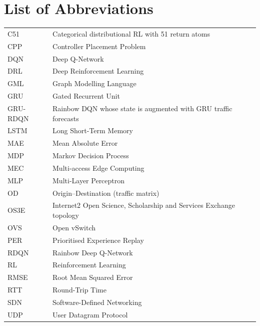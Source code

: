 \chapter*{List of Abbreviations}
\begin{tabular}{@{}p{}p{}@{}}
C51 & Categorical distributional RL with 51 return atoms \\
CPP & Controller Placement Problem \\
DQN & Deep Q-Network \\
DRL & Deep Reinforcement Learning \\
GML & Graph Modelling Language \\
GRU & Gated Recurrent Unit \\
GRU-RDQN & Rainbow DQN whose state is augmented with GRU traffic forecasts \\
LSTM & Long Short-Term Memory \\
MAE & Mean Absolute Error \\
MDP & Markov Decision Process \\
MEC & Multi-access Edge Computing \\
MLP & Multi-Layer Perceptron \\
OD & Origin--Destination (traffic matrix) \\
OS3E & Internet2 Open Science, Scholarship and Services Exchange topology \\
OVS & Open vSwitch \\
PER & Prioritised Experience Replay \\
RDQN & Rainbow Deep Q-Network \\
RL & Reinforcement Learning \\
RMSE & Root Mean Squared Error \\
RTT & Round-Trip Time \\
SDN & Software-Defined Networking \\
UDP & User Datagram Protocol \\
\end{tabular}
